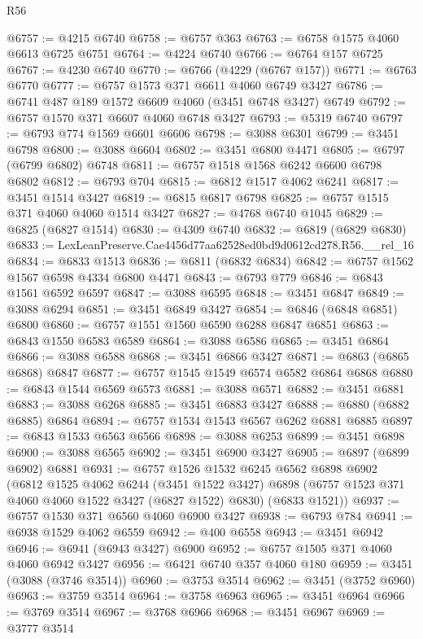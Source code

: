 \begin{lexlean}{R56}
\begin{coremodule}
@6757 := @4215 @6740
@6758 := @6757 @363
@6763 := @6758 @1575 @4060 @6613 @6725 @6751
@6764 := @4224 @6740
@6766 := @6764 @157 @6725
@6767 := @4230 @6740
@6770 := @6766 (@4229 (@6767 @157))
@6771 := @6763 @6770
@6777 := @6757 @1573 @371 @6611 @4060 @6749 @3427
@6786 := @6741 @487 @189 @1572 @6609 @4060 (@3451 @6748 @3427) @6749
@6792 := @6757 @1570 @371 @6607 @4060 @6748 @3427
@6793 := @5319 @6740
@6797 := @6793 @774 @1569 @6601 @6606
@6798 := @3088 @6301
@6799 := @3451 @6798
@6800 := @3088 @6604
@6802 := @3451 @6800 @4471
@6805 := @6797 (@6799 @6802) @6748
@6811 := @6757 @1518 @1568 @6242 @6600 @6798 @6802
@6812 := @6793 @704
@6815 := @6812 @1517 @4062 @6241
@6817 := @3451 @1514 @3427
@6819 := @6815 @6817 @6798
@6825 := @6757 @1515 @371 @4060 @4060 @1514 @3427
@6827 := @4768 @6740 @1045
@6829 := @6825 (@6827 @1514)
@6830 := @4309 @6740
@6832 := @6819 (@6829 @6830)
@6833 := LexLeanPreserve.Cae4456d77aa62528ed0bd9d0612cd278.R56.__rel_16
@6834 := @6833 @1513
@6836 := @6811 (@6832 @6834)
@6842 := @6757 @1562 @1567 @6598 @4334 @6800 @4471
@6843 := @6793 @779
@6846 := @6843 @1561 @6592 @6597
@6847 := @3088 @6595
@6848 := @3451 @6847
@6849 := @3088 @6294
@6851 := @3451 @6849 @3427
@6854 := @6846 (@6848 @6851) @6800
@6860 := @6757 @1551 @1560 @6590 @6288 @6847 @6851
@6863 := @6843 @1550 @6583 @6589
@6864 := @3088 @6586
@6865 := @3451 @6864
@6866 := @3088 @6588
@6868 := @3451 @6866 @3427
@6871 := @6863 (@6865 @6868) @6847
@6877 := @6757 @1545 @1549 @6574 @6582 @6864 @6868
@6880 := @6843 @1544 @6569 @6573
@6881 := @3088 @6571
@6882 := @3451 @6881
@6883 := @3088 @6268
@6885 := @3451 @6883 @3427
@6888 := @6880 (@6882 @6885) @6864
@6894 := @6757 @1534 @1543 @6567 @6262 @6881 @6885
@6897 := @6843 @1533 @6563 @6566
@6898 := @3088 @6253
@6899 := @3451 @6898
@6900 := @3088 @6565
@6902 := @3451 @6900 @3427
@6905 := @6897 (@6899 @6902) @6881
@6931 := @6757
    @1526
    @1532
    @6245
    @6562
    @6898
    @6902
    (@6812
      @1525
      @4062
      @6244
      (@3451 @1522 @3427)
      @6898
      (@6757 @1523 @371 @4060 @4060 @1522 @3427 (@6827 @1522) @6830)
      (@6833 @1521))
@6937 := @6757 @1530 @371 @6560 @4060 @6900 @3427
@6938 := @6793 @784
@6941 := @6938 @1529 @4062 @6559
@6942 := @400 @6558
@6943 := @3451 @6942
@6946 := @6941 (@6943 @3427) @6900
@6952 := @6757 @1505 @371 @4060 @4060 @6942 @3427
@6956 := @6421 @6740 @357 @4060 @180
@6959 := @3451 (@3088 (@3746 @3514))
@6960 := @3753 @3514
@6962 := @3451 (@3752 @6960)
@6963 := @3759 @3514
@6964 := @3758 @6963
@6965 := @3451 @6964
@6966 := @3769 @3514
@6967 := @3768 @6966
@6968 := @3451 @6967
@6969 := @3777 @3514

\end{coremodule}
\end{lexlean}
